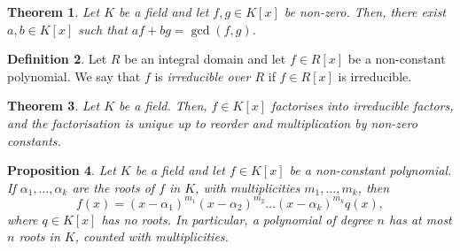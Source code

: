 \documentclass[a4paper, openany]{memoir}
\theoremstyle{definition}
\newtheorem{definition}{Definition}[section]
\theoremstyle{plain}
\newtheorem{theorem}[definition]{Theorem}
\newtheorem{proposition}[definition]{Proposition}
\begin{document}
    \begin{theorem}
        Let $K$ be a field and let $f, g \in K[x]$ be non-zero. Then, there exist $a, b \in K[x]$ such that $af + bg = \gcd(f, g)$.
    \end{theorem}

    \begin{definition}
        Let $R$ be an integral domain and let $f \in R[x]$ be a non-constant polynomial. We say that $f$ is \emph{irreducible over $R$} if $f \in R[x]$ is irreducible.
    \end{definition}

    \begin{theorem}
        Let $K$ be a field. Then, $f \in K[x]$ factorises into irreducible factors, and the factorisation is unique up to reorder and multiplication by non-zero constants.
    \end{theorem}
    
    \begin{proposition}
        Let $K$ be a field and let $f \in K[x]$ be a non-constant polynomial. If $\alpha_1, \dots, \alpha_k$ are the roots of $f$ in $K$, with multiplicities $m_1, \dots, m_k$, then
        \[f(x) = (x - \alpha_1)^{m_1} (x - \alpha_2)^{m_2} \dots (x - \alpha_k)^{m_k} q(x),\]
        where $q \in K[x]$ has no roots. In particular, a polynomial of degree $n$ has at most $n$ roots in $K$, counted with multiplicities.
    \end{proposition}
\end{document}
